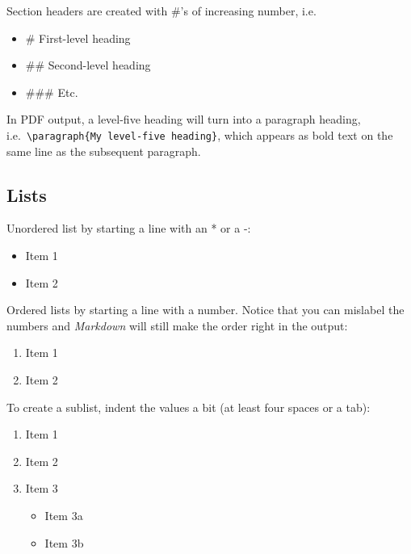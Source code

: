 \documentclass[a4paper, twoside]{templates/ociamthesis}
\providecommand{\tightlist}{%
  \setlength{\itemsep}{0pt}\setlength{\parskip}{0pt}}
\theoremstyle{definition}
\theoremstyle{definition}
\theoremstyle{definition}
\theoremstyle{definition}
\theoremstyle{remark}
\begin{document}
Section headers are created with \#'s of increasing number, i.e.~

\begin{itemize}
\tightlist
\item
  \# First-level heading
\item
  \#\# Second-level heading
\item
  \#\#\# Etc.
\end{itemize}

In PDF output, a level-five heading will turn into a paragraph heading, i.e.~\texttt{\textbackslash{}paragraph\{My\ level-five\ heading\}}, which appears as bold text on the same line as the subsequent paragraph.

\hypertarget{lists}{%
\subsection{Lists}\label{lists}}

Unordered list by starting a line with an * or a -:

\begin{itemize}
\tightlist
\item
  Item 1
\item
  Item 2
\end{itemize}

Ordered lists by starting a line with a number.
Notice that you can mislabel the numbers and \emph{Markdown} will still make the order right in the output:

\begin{enumerate}
\def\labelenumi{\arabic{enumi}.}
\tightlist
\item
  Item 1
\item
  Item 2
\end{enumerate}

To create a sublist, indent the values a bit (at least four spaces or a tab):

\begin{enumerate}
\def\labelenumi{\arabic{enumi}.}
\tightlist
\item
  Item 1
\item
  Item 2
\item
  Item 3

  \begin{itemize}
  \tightlist
  \item
    Item 3a
  \item
    Item 3b
  \end{itemize}
\end{enumerate}
\end{document}
